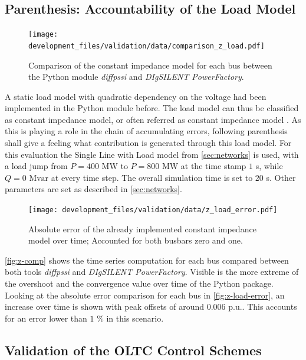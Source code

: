 \subsection{Parenthesis: Accountability of the Load Model}
\label{sec:validation-load-model}

\begin{figure}[htbp!]
    \centering
    \texttt{[image: development\_files/validation/data/comparison\_z\_load.pdf]}
    \caption[Comparison of the constant impedance model for each bus]{Comparison of the constant impedance model for each bus between the Python module \textit{diffpssi} and \textit{DIgSILENT PowerFactory}.}
    \label{fig:z-comp}
\end{figure}

A static load model with quadratic dependency on the voltage had been implemented in the Python module before.
The load model can thus be classified as constant impedance model, or often referred as constant impedance model \autocite{IEEELoadModeling_2022}. 
As this is playing a role in the chain of accumulating errors, following parenthesis shall give a feeling what contribution is generated through this load model.
For this evaluation the Single Line with Load model from \autoref{sec:networks} is used, with a load jump from $P=400\text{ MW}$ to $P=800\text{ MW}$ at the time stamp $1$ s, while $Q=0\text{ Mvar}$ at every time step.
The overall simulation time is set to $20$ s.
Other parameters are set as described in \autoref{sec:networks}.

\begin{figure}[htbp!]
    \centering
    \texttt{[image: development\_files/validation/data/z\_load\_error.pdf]}
    \caption[Absolute error comparison of the constant impedance model]{Absolute error of the already implemented constant impedance model over time; Accounted for both busbars zero and one.}
    \label{fig:z-load-error}
\end{figure}

\autoref{fig:z-comp} shows the time series computation for each bus compared between both tools \textit{diffpssi} and \textit{DIgSILENT PowerFactory}.
Visible is the more extreme of the overshoot and the convergence value over time of the Python package.
Looking at the absolute error comparison for each bus in \autoref{fig:z-load-error}, an increase over time is shown with peak offsets of around $0.006$ p.u..
This accounts for an error lower than $1$ \% in this scenario.

\subsection{Validation of the OLTC Control Schemes}
\label{sec:validation-oltc-schemes}


